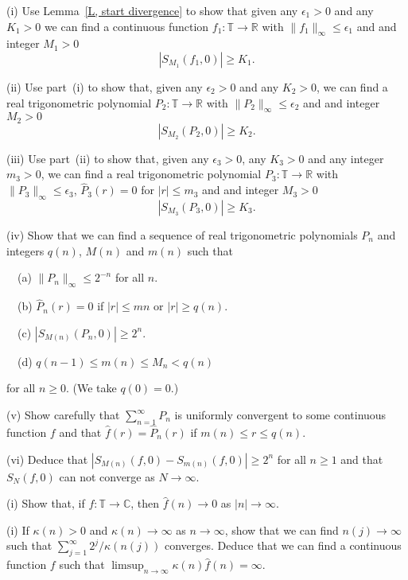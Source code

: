 \begin{question} (i) Use Lemma~\ref{L, start divergence}
to show that given any $\epsilon_{1}>0$ and any $K_{1}>0$ we can find
a continuous function
$f_{1}:{\mathbb T}\rightarrow{\mathbb R}$ with
$\|f_{1}\|_{\infty}\leq \epsilon_{1}$ and and integer $M_{1}>0$
\[|S_{M_{1}}(f_{1},0)|\geq K_{1}.\]

(ii) Use part~(i) to show that,
given any $\epsilon_{2}>0$ and
any $K_{2}>0$, we can find
a real trigonometric polynomial
$P_{2}:{\mathbb T}\rightarrow{\mathbb R}$ with
$\|P_{2}\|_{\infty}\leq \epsilon_{2}$ and and integer $M_{2}>0$
\[|S_{M_{2}}(P_{2},0)|\geq K_{2}.\]

(iii) Use part~(ii) to show that, given any $\epsilon_{3}>0$,
any $K_{3}>0$ and any integer $m_{3}>0$, we can find
a real trigonometric polynomial
$P_{3}:{\mathbb T}\rightarrow{\mathbb R}$ with
$\|P_{3}\|_{\infty}\leq \epsilon_{3}$,
$\hat{P}_{3}(r)=0$ for $|r|\leq m_{3}$ and and integer $M_{3}>0$
\[|S_{M_{3}}(P_{3},0)|\geq K_{3}.\]

(iv) Show that we can find a sequence of real trigonometric
polynomials $P_{n}$ and integers $q(n)$, $M(n)$ and $m(n)$ such that

\ \ (a) $\|P_{n}\|_{\infty}\leq 2^{-n}$ for all $n$.

\ \ (b) $\hat{P}_{n}(r)=0$ if $|r|\leq m{n}$ or $|r|\geq q(n)$.

\ \ (c) $|S_{M(n)}(P_{n},0)|\geq 2^{n}$.

\ \ (d) $q(n-1)\leq m(n)\leq M_{n}<q(n)$

\noindent for all $n\geq 0$. (We take $q(0)=0$.)

(v) Show carefully that $\sum_{n=1}^{\infty}P_{n}$ is uniformly
convergent to some continuous function $f$ and that
$\hat{f}(r)=\hat{P}_{n}(r)$ if $m(n)\leq r\leq q(n)$.

(vi) Deduce that $|S_{M(n)}(f,0)-S_{m(n)}(f,0)|\geq 2^{n}$
for all $n\geq 1$ and that $S_{N}(f,0)$ can not converge as
$N\rightarrow\infty$.
\end{question}
\begin{question} (i) Show that, if $f:{\mathbb T}\rightarrow{\mathbb C}$,
then $\hat{f}(n)\rightarrow 0$ as $|n|\rightarrow\infty$.

(i) If $\kappa(n)>0$ and
$\kappa(n)\rightarrow \infty$ as $n\rightarrow\infty$,
show that we can find $n(j)\rightarrow\infty$
such that $\sum_{j=1}^{\infty}2^{j}/\kappa(n(j))$ converges.
Deduce that
we can find a continuous function $f$
such that $\limsup_{n\rightarrow\infty}\kappa(n)\hat{f}(n)=\infty$.
\end{question}
